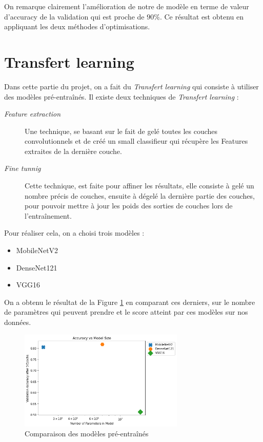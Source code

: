 \documentclass[12pt,titlepage]{article}
\begin{document}
On remarque clairement l'amélioration de notre de modèle en terme de valeur d'accuracy de la validation qui est proche de $90\%$.
Ce résultat est obtenu en appliquant les deux méthodes d'optimisations.



\section{Transfert learning}

Dans cette partie du projet, on a fait du \textit{Transfert learning} qui consiste à utiliser des modèles pré-entraînés. Il existe deux techniques de \textit{Transfert learning} :

\begin{description}
\item[\textit{Feature extraction}] Une technique, se basant sur le fait de gelé toutes les couches convolutionnels et de créé un small classifieur qui récupère les Features extraites de la dernière couche.
\item[\textit{Fine tunnig}] Cette technique, est faite pour affiner les résultats, elle consiste à gelé un nombre précis de couches, ensuite à dégelé la dernière partie des couches, pour pouvoir mettre à jour les poids des sorties de couches lors de l'entraînement.
\end{description}

Pour réaliser cela, on a choisi trois modèles :
\begin{itemize}
\item MobileNetV2
\item DenseNet121
\item VGG16
\end{itemize}
On a obtenu le résultat de la Figure \ref{compare_model} en comparant ces derniers, sur le nombre de paramètres qui peuvent prendre et le score atteint par ces modèles sur nos données.


\begin{figure}[!h]
\centering
\includegraphics[width=0.7\textwidth]{img/index.png}
\caption{Comparaison des modèles pré-entraînés}
\label{compare_model}
\end{figure}
\end{document}
